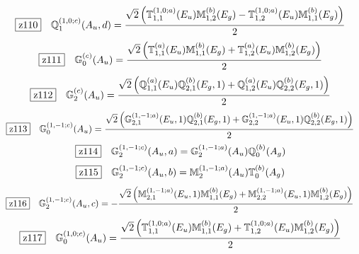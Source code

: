 \documentclass[fleqn,10pt,landscape]{jsarticle}
\begin{document}
\begin{dmath*}
\hspace*{3mm}\fbox{z110}\quad \mathbb{Q}_{1}^{(1,0;c)}(A_{u},d)=\frac{\sqrt{2} \left(\mathbb{T}_{1,1}^{(1,0;a)}(E_{u}) \mathbb{M}_{1,2}^{(b)}(E_{g}) - \mathbb{T}_{1,2}^{(1,0;a)}(E_{u}) \mathbb{M}_{1,1}^{(b)}(E_{g})\right)}{2}
\end{dmath*}
\begin{dmath*}
\hspace*{3mm}\fbox{z111}\quad \mathbb{G}_{0}^{(c)}(A_{u})=\frac{\sqrt{2} \left(\mathbb{T}_{1,1}^{(a)}(E_{u}) \mathbb{M}_{1,1}^{(b)}(E_{g}) + \mathbb{T}_{1,2}^{(a)}(E_{u}) \mathbb{M}_{1,2}^{(b)}(E_{g})\right)}{2}
\end{dmath*}
\begin{dmath*}
\hspace*{3mm}\fbox{z112}\quad \mathbb{G}_{2}^{(c)}(A_{u})=\frac{\sqrt{2} \left(\mathbb{Q}_{1,1}^{(a)}(E_{u}) \mathbb{Q}_{2,1}^{(b)}(E_{g},1) + \mathbb{Q}_{1,2}^{(a)}(E_{u}) \mathbb{Q}_{2,2}^{(b)}(E_{g},1)\right)}{2}
\end{dmath*}
\begin{dmath*}
\hspace*{3mm}\fbox{z113}\quad \mathbb{G}_{0}^{(1,-1;c)}(A_{u})=\frac{\sqrt{2} \left(\mathbb{G}_{2,1}^{(1,-1;a)}(E_{u},1) \mathbb{Q}_{2,1}^{(b)}(E_{g},1) + \mathbb{G}_{2,2}^{(1,-1;a)}(E_{u},1) \mathbb{Q}_{2,2}^{(b)}(E_{g},1)\right)}{2}
\end{dmath*}
\begin{dmath*}
\hspace*{3mm}\fbox{z114}\quad \mathbb{G}_{2}^{(1,-1;c)}(A_{u},a)=\mathbb{G}_{2}^{(1,-1;a)}(A_{u}) \mathbb{Q}_{0}^{(b)}(A_{g})
\end{dmath*}
\begin{dmath*}
\hspace*{3mm}\fbox{z115}\quad \mathbb{G}_{2}^{(1,-1;c)}(A_{u},b)=\mathbb{M}_{2}^{(1,-1;a)}(A_{u}) \mathbb{T}_{0}^{(b)}(A_{g})
\end{dmath*}
\begin{dmath*}
\hspace*{3mm}\fbox{z116}\quad \mathbb{G}_{2}^{(1,-1;c)}(A_{u},c)=- \frac{\sqrt{2} \left(\mathbb{M}_{2,1}^{(1,-1;a)}(E_{u},1) \mathbb{M}_{1,1}^{(b)}(E_{g}) + \mathbb{M}_{2,2}^{(1,-1;a)}(E_{u},1) \mathbb{M}_{1,2}^{(b)}(E_{g})\right)}{2}
\end{dmath*}
\begin{dmath*}
\hspace*{3mm}\fbox{z117}\quad \mathbb{G}_{0}^{(1,0;c)}(A_{u})=\frac{\sqrt{2} \left(\mathbb{T}_{1,1}^{(1,0;a)}(E_{u}) \mathbb{M}_{1,1}^{(b)}(E_{g}) + \mathbb{T}_{1,2}^{(1,0;a)}(E_{u}) \mathbb{M}_{1,2}^{(b)}(E_{g})\right)}{2}
\end{dmath*}
\end{document}
